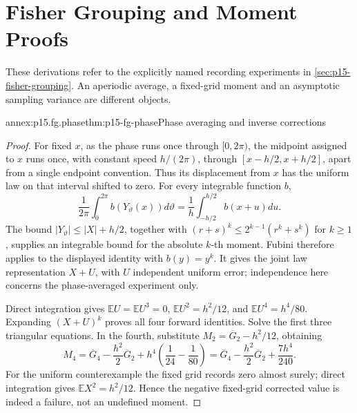\section{Fisher Grouping and Moment Proofs}
\label{sec:p15-fisher-grouping-annex}

These derivations refer to the explicitly named recording experiments in
\cref{sec:p15-fisher-grouping}. An aperiodic average, a fixed-grid moment
and an asymptotic sampling variance are different objects.

\begin{annexitem}{annex:p15.fg.phase}{thm:p15-fg-phase}{Phase averaging and inverse corrections}
\begin{proof}
For fixed \(x\), as the phase runs once through \([0,2\pi)\), the
midpoint assigned to \(x\) runs once, with constant speed \(h/(2\pi)\),
through \([x-h/2,x+h/2]\), apart from a single endpoint convention.
Thus its displacement from \(x\) has the uniform law on that interval
shifted to zero. For every integrable function \(b\),
\[
 \frac1{2\pi}\int_0^{2\pi}b(Y_\vartheta(x))d\vartheta
 =\frac1h\int_{-h/2}^{h/2}b(x+u)du.
\]
The bound \(|Y_\vartheta|\leq|X|+h/2\), together with
\((r+s)^k\leq2^{k-1}(r^k+s^k)\) for \(k\geq1\), supplies an
integrable bound for the absolute \(k\)-th moment. Fubini therefore
applies to the displayed identity with \(b(y)=y^k\). It gives the joint
law representation \(X+U\), with \(U\) independent uniform error;
independence here concerns the phase-averaged experiment only.

Direct integration gives \(\mathbb EU=\mathbb EU^3=0\),
\(\mathbb EU^2=h^2/12\), and \(\mathbb EU^4=h^4/80\).
Expanding \((X+U)^k\) proves all four forward identities. Solve the
first three triangular equations. In the fourth, substitute
\(M_2=\overline G_2-h^2/12\), obtaining
\[
 M_4=\overline G_4-\frac{h^2}{2}\overline G_2
       +h^4\left(\frac1{24}-\frac1{80}\right)
     =\overline G_4-\frac{h^2}{2}\overline G_2+\frac{7h^4}{240}.
\]
For the uniform counterexample the fixed grid records zero almost surely;
direct integration gives \(\mathbb EX^2=h^2/12\). Hence the negative
fixed-grid corrected value is indeed a failure, not an undefined moment.
\end{proof}
\end{annexitem}

